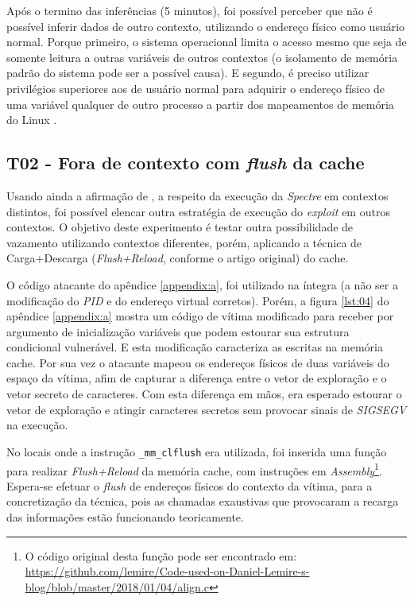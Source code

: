 \documentclass[conference]{IEEEtran}
\begin{document}


Após o termino das inferências (5 minutos), foi possível perceber que não é possível inferir dados de outro contexto, utilizando o endereço físico como usuário normal. Porque primeiro, o sistema operacional limita o acesso mesmo que seja de somente leitura a outras variáveis de outros contextos (o isolamento de memória padrão do sistema pode ser a possível causa). E segundo, é preciso utilizar privilégios superiores aos de usuário normal para adquirir o endereço físico de uma variável qualquer de outro processo a partir dos mapeamentos de memória do Linux \cite{EQWARE2009Capturing}.

\subsection{T02 - Fora de contexto com \emph{flush} da cache}
Usando ainda a afirmação de , a respeito da execução da \emph{Spectre} em contextos distintos, foi possível elencar outra estratégia de execução do \emph{exploit} em outros contextos. O objetivo deste experimento é testar outra possibilidade de vazamento utilizando contextos diferentes, porém, aplicando a técnica de Carga+Descarga (\emph{Flush+Reload}, conforme o artigo original) do cache.

O código atacante do apêndice \ref{appendix:a}, foi utilizado na íntegra (a não ser a modificação do \emph{PID} e do endereço virtual corretos). Porém, a figura \ref{lst:04} do apêndice \ref{appendix:a} mostra um código de vítima modificado para receber por argumento de inicialização variáveis que podem estourar sua estrutura condicional vulnerável. E esta modificação caracteriza as escritas na memória cache. Por sua vez o atacante mapeou os endereços físicos de duas variáveis do espaço da vítima, afim de capturar a diferença entre o vetor de exploração e o vetor secreto de caracteres. Com esta diferença em mãos, era esperado estourar o vetor de exploração e atingir caracteres secretos sem provocar sinais de \emph{SIGSEGV} na execução.

No locais onde a instrução \lstinline[language=C, style=c]{_mm_clflush} era utilizada, foi inserida uma função para realizar \emph{Flush+Reload} da memória cache, com instruções em \emph{Assembly}\footnote{O código original desta função pode ser encontrado em: \url{https://github.com/lemire/Code-used-on-Daniel-Lemire-s-blog/blob/master/2018/01/04/align.c}}. Espera-se efetuar o \emph{flush} de endereços físicos do contexto da vítima, para a concretização da técnica, pois as chamadas exaustivas que provocaram a recarga das informações estão funcionando teoricamente.
\end{document}
